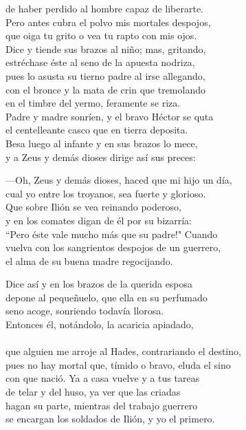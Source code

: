 de haber perdido al hombre capaz de liberarte.\\
Pero antes cubra el polvo mis mortales despojos,\\
que oiga tu grito o vea tu rapto con mis ojos.\\
Dice y tiende sus brazos al niño; mas, gritando,\\
estréchase éste al seno de la apuesta nodriza,\\
pues lo asusta su tierno padre al irse allegando,\\
con el bronce y la mata de crin que tremolando\\
en el timbre del yermo, feramente se riza.\\
Padre y madre sonríen, y el bravo Héctor se quta\\
el centelleante casco que en tierra deposita.\\
Besa luego al infante y en sus brazos lo mece,\\
y a Zeus y demás dioses dirige así sus preces:\par
---Oh, Zeus y demás dioses, haced que mi hijo un día,\\
cual yo entre los troyanos, sea fuerte y glorioso.\\
Que sobre Ilión se vea reinando poderoso,\\
y en los comates digan de él por su bizarría:\\
``Pero éste vale mucho más que su padre!" Cuando\\
vuelva con los sangrientos despojos de un guerrero,\\
el alma de su buena madre regocijando.\par
Dice así y en los brazos de la querida esposa\\
depone al pequeñuelo, que ella en su perfumado\\
seno acoge, sonriendo todavía llorosa.\\
Entonces él, notándolo, la acaricia apiadado,\\
\\
que alguien me arroje al Hades, contrariando el destino,\\
pues no hay mortal que, tímido o bravo, eluda el sino\\
con que nació. Ya a casa vuelve y a tus tareas\\
de telar y del huso, ya  ver que las criadas\\
hagan su parte, mientras del trabajo guerrero\\
se encargan los soldados de Ilión, y yo el primero.\par
\poend
\enum